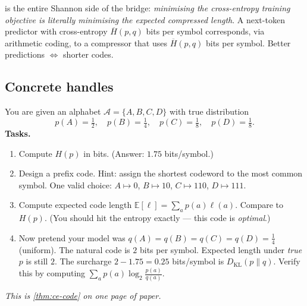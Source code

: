 \documentclass[12pt,a4paper]{article}
\theoremstyle{plain}
\theoremstyle{definition}
\begin{document}
 is the entire Shannon side of the bridge:
\emph{minimising the cross-entropy training objective is literally
minimising the expected compressed length}.  A next-token predictor
with cross-entropy $\overline{H}(p,q)$ bits per symbol corresponds,
via arithmetic coding, to a compressor that uses
$\overline{H}(p,q)$ bits per symbol.  Better predictions
$\Leftrightarrow$ shorter codes.


\subsection*{Concrete handles}

\begin{activity}[title={Activity 3.A --- Compress your own message (paper, 10 min)}]
\label{act:compress-paper}
You are given an alphabet $\mathcal{A} = \{A, B, C, D\}$ with true
distribution
\[
 p(A) = \tfrac{1}{2}, \quad p(B) = \tfrac{1}{4}, \quad
 p(C) = \tfrac{1}{8}, \quad p(D) = \tfrac{1}{8}.
\]
\textbf{Tasks.}
\begin{enumerate}[leftmargin=*, itemsep=2pt]
  \item Compute $H(p)$ in bits.  (Answer: $1.75$ bits/symbol.)
  \item Design a prefix code.  Hint: assign the shortest codeword to
        the most common symbol.  One valid choice: $A\!\mapsto\!0$,
        $B\!\mapsto\!10$, $C\!\mapsto\!110$, $D\!\mapsto\!111$.
  \item Compute expected code length
        $\mathbb{E}[\ell] = \sum_a p(a)\ell(a)$.  Compare to $H(p)$.
        (You should hit the entropy exactly --- this code is
        \emph{optimal}.)
  \item Now pretend your model was $q(A)=q(B)=q(C)=q(D)=\tfrac{1}{4}$
        (uniform).  The natural code is $2$ bits per symbol.
        Expected length under \emph{true} $p$ is still $2$.  The
        surcharge $2 - 1.75 = 0.25$ bits/symbol is
        $D_{\mathrm{KL}}(p\|q)$.  Verify this by computing
        $\sum_a p(a)\log_2\frac{p(a)}{q(a)}$.
\end{enumerate}
\emph{This is \cref{thm:ce-code} on one page of paper.}
\end{activity}
\end{document}
